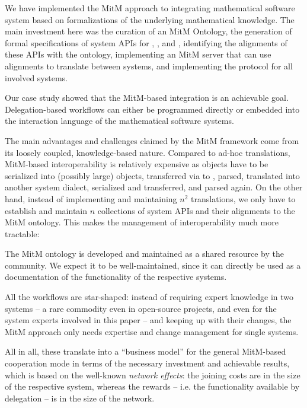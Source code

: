 We have implemented the MitM approach to integrating mathematical software system based on formalizations of the underlying mathematical knowledge.
The main investment here was the curation of an MitM Ontology, the generation of formal specifications of system APIs for \Sage, \GAP, and \Singular, identifying the alignments of these APIs with the ontology, implementing an MitM server that can use alignments to translate between systems, and implementing the \SCSCP protocol for all involved systems. 

Our case study showed that the MitM-based integration is an achievable goal.
Delegation-based workflows can either be programmed directly or embedded into the interaction language of the mathematical software systems.

The main advantages and challenges claimed by the MitM framework come from its loosely coupled, knowledge-based nature.
Compared to ad-hoc translations, MitM-based interoperability is relatively expensive as objects have to be serialized into (possibly large) \OMMT objects, transferred via \SCSCP to \MMT, parsed, translated into another system dialect, serialized and transferred, and parsed again.
On the other hand, instead of implementing and maintaining $n^2$ translations, we only have to establish and maintain $n$ collections of system APIs and their alignments to the
MitM ontology.
This makes the management of interoperability much more tractable:
\begin{compactenum}
\item The MitM ontology is developed and maintained as a shared resource by the community.
We expect it to be well-maintained, since it can directly be used as a documentation of the functionality of the respective systems.
\item All the workflows are star-shaped: instead of requiring expert knowledge in two systems -- a rare commodity even in open-source projects, and even for the system experts involved in this paper -- and keeping up with their changes, the MitM approach only needs expertise and change management for single systems.
\end{compactenum}
All in all, these translate into a ``business model'' for the general MitM-based cooperation mode in terms of the necessary investment and achievable results, which is based on the well-known \emph{network effects}: the joining costs are in the size of the respective system, whereas the rewards -- i.e. the functionality available by delegation -- is in the size of the network.

